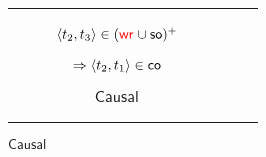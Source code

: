 \begin{figure*}
{\begin{tabular}{|c|c|c|}
\begin{subfigure}[t]{.3\textwidth}
{     \hspace{9mm}${\left\langle{{t}_2,{t}_3}\right\rangle}\in(\textcolor{red}{\mathsf{wr}_{}}\cup\mathsf{so})^+$
     
     \hspace{14mm}$\Rightarrow {\left\langle{{t}_2,{t}_1}\right\rangle}\in\mathsf{co}$
    }
    
    \caption{$\mathsf{Causal}$}
    \label{cc_def}
   \end{subfigure}
   
   
%    
%     
%     
%     
%    
%          
%   

\end{tabular}}
\end{figure*}
